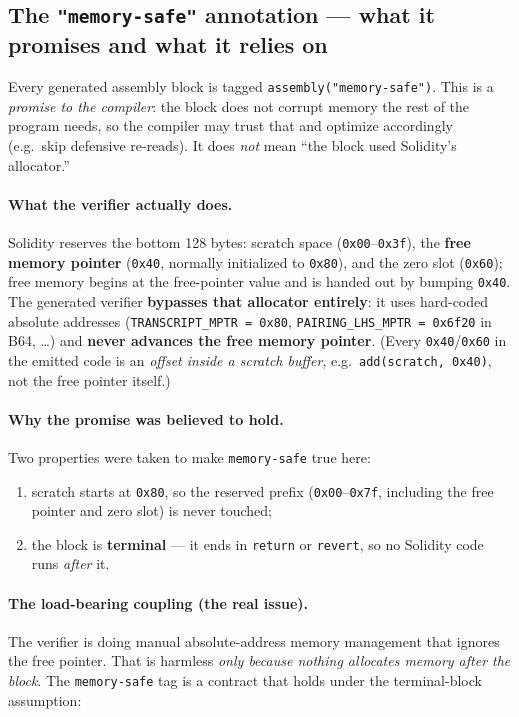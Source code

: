 \subsection{The \texttt{"memory-safe"} annotation --- what it promises and what it relies on}
\label{sec:memory-safe}

Every generated assembly block is tagged \texttt{assembly("memory-safe")}.
This is a \emph{promise to the compiler}: the block does not corrupt
memory the rest of the program needs, so the compiler may trust that and
optimize accordingly (e.g.\ skip defensive re-reads). It does \emph{not}
mean ``the block used Solidity's allocator.''

\paragraph{What the verifier actually does.} Solidity reserves the bottom
128 bytes: scratch space (\texttt{0x00}--\texttt{0x3f}), the
\textbf{free memory pointer} (\texttt{0x40}, normally initialized to
\texttt{0x80}), and the zero slot (\texttt{0x60}); free memory begins at
the free-pointer value and is handed out by bumping \texttt{0x40}. The generated verifier \textbf{bypasses
that allocator entirely}: it uses hard-coded absolute addresses
(\texttt{TRANSCRIPT\_\allowbreak{}MPTR = 0x80}, \texttt{PAIRING\_\allowbreak{}LHS\_\allowbreak{}MPTR =
0x6f20} in B64, \ldots) and \textbf{never advances the free memory pointer}.
(Every \texttt{0x40}/\texttt{0x60} in the emitted code is an
\emph{offset inside a scratch buffer}, e.g.\ \texttt{add(scratch, 0x40)},
not the free pointer itself.)

\paragraph{Why the promise was believed to hold.} Two properties were
taken to make \texttt{memory-safe} true here:
\begin{enumerate}[leftmargin=1.4em,itemsep=1pt]
  \item scratch starts at \texttt{0x80}, so the reserved prefix
        (\texttt{0x00}--\texttt{0x7f}, including the free pointer and
        zero slot) is never touched;
  \item the block is \textbf{terminal} --- it ends in \texttt{return} or
        \texttt{revert}, so no Solidity code runs \emph{after} it.
\end{enumerate}

\paragraph{The load-bearing coupling (the real issue).} The verifier is
doing manual absolute-address memory management that ignores the free
pointer. That is harmless \emph{only because nothing allocates memory
after the block}. The \texttt{memory-safe} tag is a contract that holds
under the terminal-block assumption:

